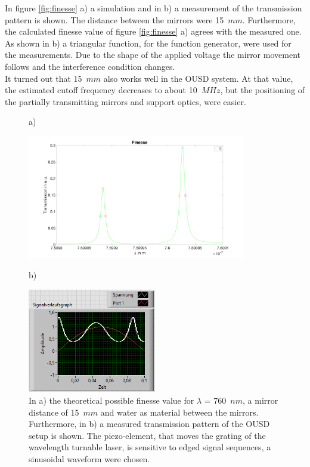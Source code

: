 In figure \ref{fig:finesse} a) a simulation and in b) a measurement of the transmission pattern is shown. The distance between the mirrors were 15~$mm$. Furthermore, the calculated finesse value of figure \ref{fig:finesse} a) agrees with the measured one.\\
As shown in b) a triangular function, for the function generator, were used for the measurements. Due to the shape of the applied voltage the mirror movement follows and the interference condition changes.\\
It turned out that 15~$mm$ also works well in the OUSD system. At that value, the estimated cutoff frequency decreases to about 10~$MHz$, but the positioning of the partially transmitting mirrors and support optics, were easier.\\

\begin{figure}[H]
	a)
	\begin{minipage}[c]{\textwidth}	
		\begin{center}	
		\includegraphics[width = 0.85\textwidth, height=0.3\textheight]{06_ex-results_of_OUSD/images/finesse760.png}
	\end{center}
	\end{minipage}
	b)
	\begin{minipage}[c]{\textwidth}	
		\vspace*{0.5cm}
		\begin{center}
		\includegraphics[width = 0.5\textwidth, height=0.25\textheight]{06_ex-results_of_OUSD/images/res_air_piezo@1V.png}
	\end{center}
	\end{minipage}
	\caption{In a) the theoretical possible finesse value for $\lambda$ = 760~$nm$, a mirror distance of 15~$mm$ and water as material between the mirrors. Furthermore, in b) a measured transmission pattern of the OUSD setup is shown. The piezo-element, that moves the grating of the wavelength turnable laser, is sensitive to edged signal sequences, a sinusoidal waveform were chosen.}
	\label{fig:finesseMeas}
\end{figure}


